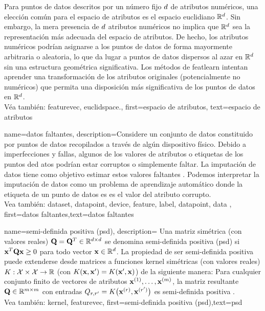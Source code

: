 {{Para puntos de datos descritos por un número fijo $d$ de atributos numéricos, 
una elección común para el espacio de atributos es el espacio euclidiano $\mathbb{R}^{d}$. 
Sin embargo, la mera presencia de $d$ atributos numéricos no implica que 
$\mathbb{R}^{d}$ sea la representación más adecuada del espacio de atributos. 
De hecho, los atributos numéricos podrían asignarse a los puntos de datos de forma mayormente arbitraria o aleatoria, 
lo que da lugar a puntos de datos dispersos al azar en $\mathbb{R}^{d}$ 
sin una estructura geométrica significativa. Los métodos de \gls{featlearn} intentan aprender 
una transformación de los atributos originales (potencialmente no numéricos) que permita 
una disposición más significativa de los puntos de datos en $\mathbb{R}^{d}$.\\
		Véa también: \gls{featurevec}, \gls{euclidspace}.},
	first={espacio de atributos},
	text={espacio de atributos}  
}



{name={datos faltantes},
	description={Considere un conjunto de datos constituido por puntos de datos recopilados  
		a través de algún dispositivo físico. Debido a imperfecciones y fallas, algunos de los valores de atributos
		o etiquetas de los puntos ded atos podrían estar corruptos o simplemente faltar.  
		La imputación de datos tiene como objetivo estimar estos valores faltantes \cite{Abayomi2008DiagnosticsFM}. 
		Podemos interpretar la imputación de datos como un problema de aprendizaje automático donde la etiqueta de un punto de datos es 
		es el valor del atributo corrupto. 
		\\
		Vea también:  \gls{dataset}, \gls{datapoint}, \gls{device}, \gls{feature}, \gls{label}, \gls{datapoint}, \Gls{data} },
	first={datos faltantes},text={datos faltantes}  
}


{name={semi-definida positiva (psd)},
    description=
    {Una  matriz simétrica (con valores reales) $\mathbf{Q} = \mathbf{Q}^{T} \in \mathbb{R}^{d \times d}$ 
	se denomina semi-definida positiva (psd) si ${\bf x}^{T} \mathbf{Q} {\bf x} \geq 0$ para todo vector ${\bf x} \in \mathbb{R}^{d}$. 
	La propiedad de ser semi-definida positiva puede extenderse desde matrices a funciones kernel simétricas (con valores reales) 
	$K: \mathcal{X} \times \mathcal{X} \rightarrow \mathbb{R}$ 
	(con $K({\bf x},{\bf x}') = K({\bf x}',{\bf x})$)
	de la siguiente manera: Para cualquier conjunto finito de vectores de atributos ${\bf x}^{(1)},\dots,{\bf x}^{(m)}$, 
	la matriz resultante $\mathbf{Q} \in \mathbb{R}^{m \times m}$ con 
	entradas $Q_{r,r'} = K\big({\bf x}^{(r)},{\bf x}^{(r')}\big)$ 
	es semi-definida positiva \cite{LearningKernelsBook}.
	\\
		Vea también: \gls{kernel}, \gls{featurevec}},
    first={semi-definida positiva (psd)},text={psd}  
}

